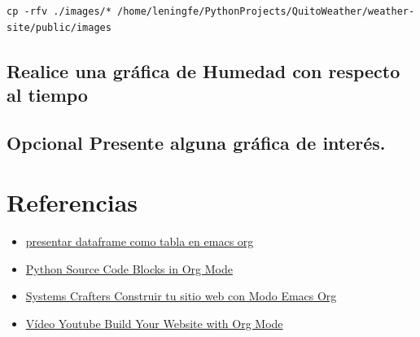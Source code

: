 \documentclass{article}
\begin{document}
\begin{verbatim}
cp -rfv ./images/* /home/leningfe/PythonProjects/QuitoWeather/weather-site/public/images
\end{verbatim}
\subsection{Realice una gráfica de Humedad con respecto al tiempo}
\label{sec:orgb1dcdc1}
\subsection{\textbf{Opcional} Presente alguna gráfica de interés.}
\label{sec:org99a9f4a}
\section{Referencias}
\label{sec:org8b06e0d}
\begin{itemize}
\item \href{https://emacs.stackexchange.com/questions/28715/get-pandas-data-frame-as-a-table-in-org-babel}{presentar dataframe como tabla en emacs org}
\item \href{https://orgmode.org/worg/org-contrib/babel/languages/ob-doc-python.html}{Python Source Code Blocks in Org Mode}
\item \href{https://systemcrafters.net/publishing-websites-with-org-mode/building-the-site/}{Systems Crafters Construir tu sitio web con Modo Emacs Org}
\item \href{https://www.youtube.com/watch?v=AfkrzFodoNw}{Vídeo Youtube Build Your Website with Org Mode}
\end{itemize}
\end{document}
